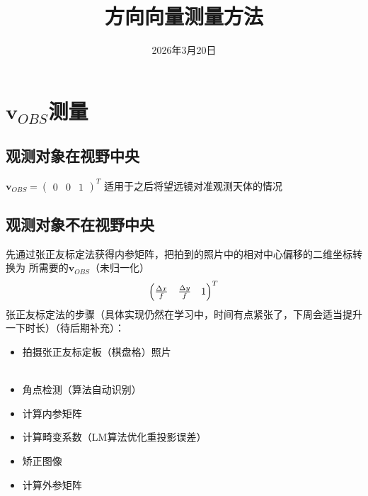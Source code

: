 \documentclass{ctexart}
\title{方向向量测量方法}
\date{2026年3月20日}
\begin{document}
\maketitle
\section{$\bm{v}_{OBS}$测量}
\subsection{观测对象在视野中央}
$\bm{v}_{OBS} = 
{\begin{pmatrix}
    0 & 0 & 1
\end{pmatrix}}^T$
适用于之后将望远镜对准观测天体的情况
\subsection{观测对象不在视野中央}
先通过张正友标定法获得内参矩阵，把拍到的照片中的相对中心偏移的二维坐标转换为
所需要的$\bm{v}_{OBS}$（未归一化）\\
\begin{equation}
{\begin{pmatrix}
    \Delta x \over f & \Delta y \over f & 1
\end{pmatrix}}^T\end{equation}
张正友标定法的步骤（具体实现仍然在学习中，时间有点紧张了，下周会适当提升一下时长）（待后期补充）：
\begin{itemize}
    \item 拍摄张正友标定板（棋盘格）照片 \\
    \\
    \item 角点检测（算法自动识别）
    \item 计算内参矩阵
    \item 计算畸变系数（LM算法优化重投影误差）
    \item 矫正图像
    \item 计算外参矩阵
\end{itemize}
\end{document}
